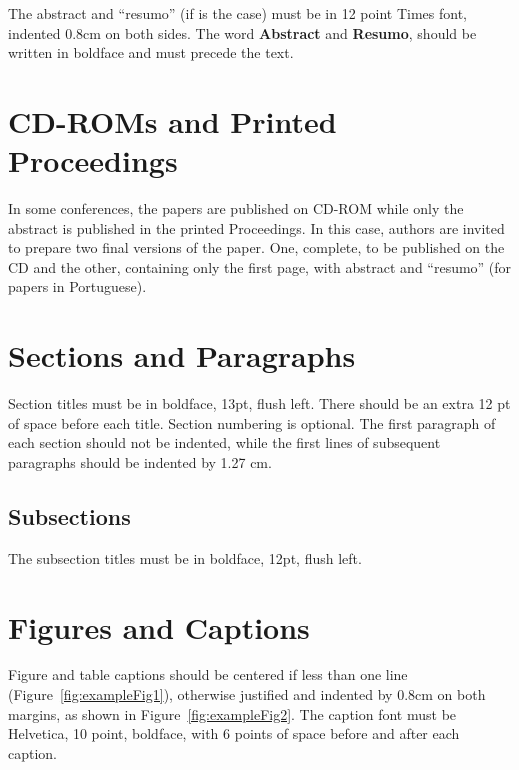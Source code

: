 \documentclass[12pt]{article}
\begin{document}
The abstract and ``resumo'' (if is the case) must be in 12 point Times font,
indented 0.8cm on both sides. The word \textbf{Abstract} and \textbf{Resumo},
should be written in boldface and must precede the text.

\section{CD-ROMs and Printed Proceedings}

In some conferences, the papers are published on CD-ROM while only the
abstract is published in the printed Proceedings. In this case, authors are
invited to prepare two final versions of the paper. One, complete, to be
published on the CD and the other, containing only the first page, with
abstract and ``resumo'' (for papers in Portuguese).

\section{Sections and Paragraphs}

Section titles must be in boldface, 13pt, flush left. There should be an extra
12 pt of space before each title. Section numbering is optional. The first
paragraph of each section should not be indented, while the first lines of
subsequent paragraphs should be indented by 1.27 cm.

\subsection{Subsections}

The subsection titles must be in boldface, 12pt, flush left.

\section{Figures and Captions}\label{sec:figs}


Figure and table captions should be centered if less than one line
(Figure~\ref{fig:exampleFig1}), otherwise justified and indented by 0.8cm on
both margins, as shown in Figure~\ref{fig:exampleFig2}. The caption font must
be Helvetica, 10 point, boldface, with 6 points of space before and after each
caption.

\end{document}
